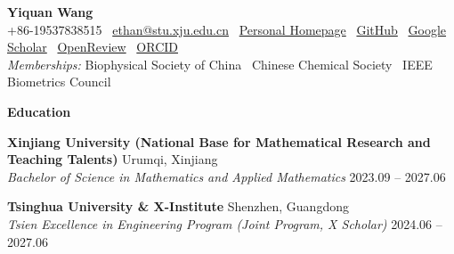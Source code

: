 \documentclass[10pt]{article}
\begin{document}
	\pagestyle{empty}
	\begin{center}
		\textbf{\Large Yiquan Wang}\\
		\vspace{3pt}
		+86-19537838515 \textbullet \ \href{mailto:ethan@stu.xju.edu.cn}{ethan@stu.xju.edu.cn} \textbullet \ \href{https://wyqmath.cn/}{Personal Homepage} \textbullet \ \href{https://github.com/wyqmath}{GitHub} \textbullet \ \href{https://scholar.google.com/citations?user=ULP3e1cAAAAJ}{Google Scholar} \textbullet \ \href{https://openreview.net/profile?id=~Yiquan_Wang3}{OpenReview} \textbullet \ \href{https://orcid.org/0000-0003-1417-5752}{ORCID} \\
		\vspace{2pt}
		\textit{Memberships:} Biophysical Society of China \textbullet \ Chinese Chemical Society \textbullet \ IEEE Biometrics Council \\
		\vspace{-2pt}
		\hrulefill
	\end{center}
	
	\vspace{-2pt}
	\begin{center}
		\textbf{\large Education}
	\end{center}
	\vspace{-4pt}
	\textbf{Xinjiang University (National Base for Mathematical Research and Teaching Talents)} \hfill Urumqi, Xinjiang \\
	\textit{Bachelor of Science in Mathematics and Applied Mathematics} \hfill 2023.09 – 2027.06 
	
	\vspace{2pt}
	\textbf{Tsinghua University \& X-Institute} \hfill Shenzhen, Guangdong \\
	\textit{Tsien Excellence in Engineering Program (Joint Program, X Scholar)} \hfill 2024.06 – 2027.06
	
\end{document}

